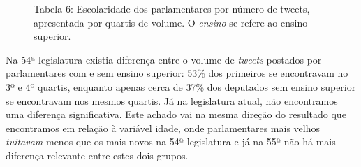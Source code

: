 \begin{figure}[!ht]

\caption{Tabela 6: Escolaridade dos parlamentares por número de tweets,
apresentada por quartis de volume. O \textit{ensino} se refere ao ensino superior.\footnotemark}
\end{figure}


Na 54ª legislatura existia diferença entre o volume de \emph{tweets}
postados por parlamentares com e sem ensino superior: 53\% dos primeiros
se encontravam no 3º e 4º quartis, enquanto apenas cerca de 37\% dos
deputados sem ensino superior se encontravam nos mesmos quartis. Já na
legislatura atual, não encontramos uma diferença significativa. Este
achado vai na mesma direção do resultado que encontramos em relação à
variável idade, onde parlamentares mais velhos \emph{tuitavam} menos que
os mais novos na 54ª legislatura e já na 55ª não há mais diferença
relevante entre estes dois grupos.



